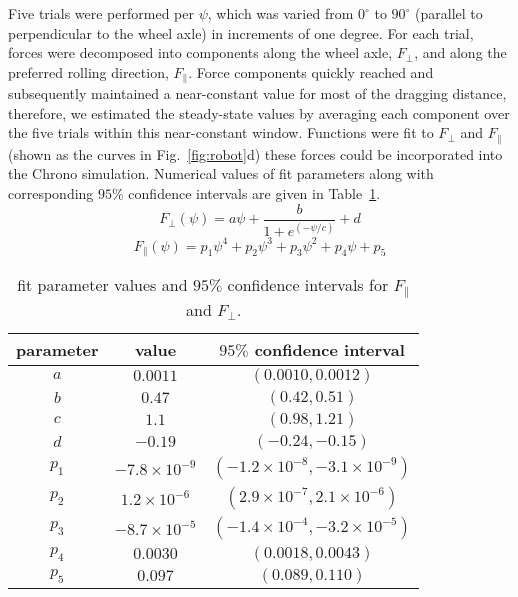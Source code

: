 \documentclass[aps,pre,twocolumn,superscriptaddress]{revtex4-1}
\begin{document}
Five trials were performed per $\psi$, which was varied from $0^{\circ}$ to $90^{\circ}$ (parallel to perpendicular to the wheel axle) in increments of one degree. For each trial, forces were decomposed into components along the wheel axle, $F_{\perp}$, and along the preferred rolling direction, $F_{\parallel}$. Force components quickly reached and subsequently maintained a near-constant value for most of the dragging distance, therefore, we estimated the steady-state values by averaging each component over the five trials within this near-constant window. Functions were fit to $F_{\perp}$ and $F_{\parallel}$ (shown as the curves in Fig.~\ref{fig:robot}d) these forces could be incorporated into the Chrono simulation. Numerical values of fit parameters along with corresponding $95\%$ confidence intervals are given in Table~\ref{tab:fitParams}.
\begin{equation*}
F_\perp(\psi)=a\psi+\frac{b}{1+e^(-\psi/c)}+d
\end{equation*}
\begin{equation*}
F_{\parallel} (\psi)=p_1 \psi^4+p_2 \psi^3+p_3 \psi^2+p_4 \psi+p_5
\end{equation*}
\begin{center}
	\begin{table}
		\centering
		\begin{tabular}{ | c | c | c | }
			\hline
			parameter & value & $95\%$ confidence interval  \\ \hline
			$a$ & $0.0011$ & $(0.0010,0.0012)$ \\ \hline
			$b$ & $0.47$ & $(0.42,0.51)$ \\ \hline
			$c$ & $1.1$ & $(0.98,1.21)$ \\ \hline
			$d$ & $-0.19$ & $(-0.24,-0.15)$ \\ \hline
			$p_1$ & $-7.8 \times 10^{-9}$ & $(-1.2\times 10^{-8},-3.1 \times 10^{-9})$ \\ \hline
			$p_2$ & $1.2 \times 10^{-6}$ & $(2.9 \times 10^{-7},2.1 \times 10^{-6})$ \\ \hline
			$p_3$ & $-8.7 \times 10^{-5}$ & $(-1.4 \times 10^{-4},-3.2 \times 10^{-5})$ \\ \hline
			$p_4$ & $0.0030$ & $(0.0018,0.0043)$ \\ \hline
			$p_5$ & $0.097$ & $(0.089,0.110)$ \\ \hline
		\end{tabular} 
		\caption{fit parameter values and $95\%$ confidence intervals for $F_\parallel$ and $F_\perp$.}
		\label{tab:fitParams}
	\end{table}
\end{center}
\end{document}
